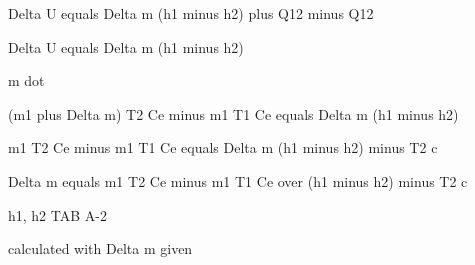 Delta U equals Delta m (h1 minus h2) plus Q12 minus Q12

Delta U equals Delta m (h1 minus h2)

m dot

(m1 plus Delta m) T2 Ce minus m1 T1 Ce equals Delta m (h1 minus h2)

m1 T2 Ce minus m1 T1 Ce equals Delta m (h1 minus h2) minus T2 c

Delta m equals m1 T2 Ce minus m1 T1 Ce over (h1 minus h2) minus T2 c

h1, h2 TAB A-2

calculated with Delta m given